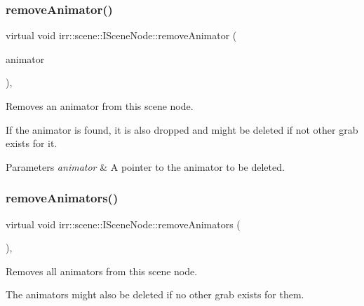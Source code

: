 \subsubsection{\texorpdfstring{remove\+Animator()}{removeAnimator()}\hspace{0.1cm}{\footnotesize\ttfamily [2/2]}}
{\footnotesize\ttfamily virtual void irr\+::scene\+::\+I\+Scene\+Node\+::remove\+Animator (\begin{DoxyParamCaption}\item[{\hyperlink{classirr_1_1scene_1_1ISceneNodeAnimator}{I\+Scene\+Node\+Animator} $\ast$}]{animator }\end{DoxyParamCaption})\hspace{0.3cm}{\ttfamily [inline]}, {\ttfamily [virtual]}}



Removes an animator from this scene node. 

If the animator is found, it is also dropped and might be deleted if not other grab exists for it. 
\begin{DoxyParams}{Parameters}
{\em animator} & A pointer to the animator to be deleted. \\
\hline
\end{DoxyParams}
\mbox{\label{classirr_1_1scene_1_1ISceneNode_a28f198bd566e9a7290cbefa531d8d31e}} 
\subsubsection{\texorpdfstring{remove\+Animators()}{removeAnimators()}\hspace{0.1cm}{\footnotesize\ttfamily [1/2]}}
{\footnotesize\ttfamily virtual void irr\+::scene\+::\+I\+Scene\+Node\+::remove\+Animators (\begin{DoxyParamCaption}{ }\end{DoxyParamCaption})\hspace{0.3cm}{\ttfamily [inline]}, {\ttfamily [virtual]}}



Removes all animators from this scene node. 

The animators might also be deleted if no other grab exists for them. \mbox{\label{classirr_1_1scene_1_1ISceneNode_a28f198bd566e9a7290cbefa531d8d31e}} 
